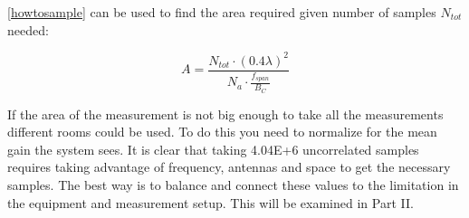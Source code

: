 
\autoref{howtosample} can be used to find the area required given number of samples $N_{tot}$ needed:

\begin{equation}
A  = \frac{N_{tot}\cdot (0.4\lambda)^2}{N_a\cdot \frac{f_{span}}{B_C}}
\label{howtosqaure}
\end{equation}

If the area of the measurement is not big enough to take all the measurements different rooms could be used. To do this you need to normalize for the mean gain the system sees. It is clear that taking 4.04E+6 uncorrelated samples requires taking advantage of frequency, antennas and space to get the necessary samples. The best way is to balance and connect these values to the limitation in the equipment and measurement setup. This will be examined in Part II. 


